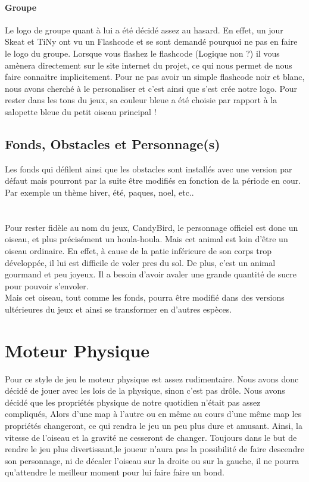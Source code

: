\documentclass [11pt]{report}
\begin{document}
			\paragraph{Groupe}
			Le logo de groupe quant à lui a été décidé assez au hasard. En effet, un jour Skeat et TiNy ont vu un Flashcode et se sont demandé pourquoi ne pas en faire le logo du groupe. Lorsque vous flashez le flashcode (Logique non ?) il vous amènera directement sur le site internet du projet, ce qui nous permet de nous faire connaitre implicitement. Pour ne pas avoir un simple flashcode noir et blanc, nous avons cherché à le personaliser et c'est ainsi que s'est crée notre logo. Pour rester dans les tons du jeux, sa couleur bleue a été choisie par rapport à la salopette bleue du petit oiseau principal !\\\vspace{5mm}

		\subsection {Fonds, Obstacles et Personnage(s)}
 		Les fonds qui défilent ainsi que les obstacles sont installés avec une version par défaut mais pourront par la suite être modifiés en fonction de la période en cour. Par exemple un thème hiver, été, paques, noel, etc..\\\\\\
 \indent Pour rester fidèle au nom du jeux, CandyBird, le personnage officiel est donc un oiseau, et plus précisément un houla-houla.
 		Mais cet animal est loin d'être un oiseau ordinaire. En effet, à cause de la patie inférieure de son corps trop développée, il lui est difficile de voler pres du sol. De plus, c'est un animal gourmand et peu joyeux. Il a besoin d'avoir avaler une grande quantité de sucre pour pouvoir s'envoler.\\
Mais cet oiseau, tout comme les fonds, pourra être modifié dans des versions ultérieures du jeux et ainsi se transformer en d'autres espèces.\\\vspace{5mm}



	\section {Moteur Physique}
		Pour ce style de jeu le moteur physique est assez rudimentaire. Nous avons donc décidé de jouer avec les lois de la physique, sinon c'est pas drôle. Nous avons décidé que les propriétés physique de notre quotidien n'était pas assez compliqués, Alors d'une map à l'autre ou en même au cours d'une même map les propriétés 			changeront, ce qui rendra le jeu un peu plus dure et amusant. Ainsi, la vitesse de l'oiseau et la gravité ne cesseront de changer. Toujours dans le but de rendre le jeu plus divertissant,le joueur n'aura pas la possibilité de faire descendre son personnage, ni de décaler l'oiseau sur la droite ou sur la gauche, il ne pourra qu'attendre le meilleur 	moment pour lui faire faire un bond.\\\vspace{5mm}
\end{document}

